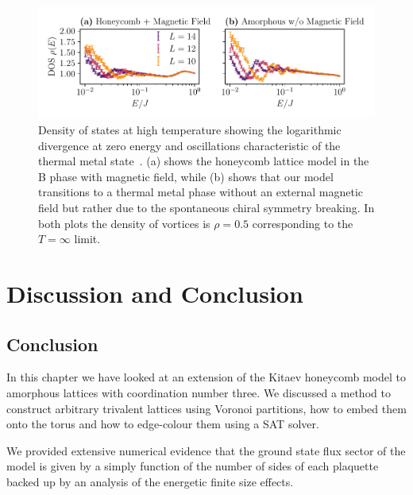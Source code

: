 \hypertarget{fig:DOS_oscillations}{%
\begin{figure}
\centering
\includegraphics[width=1\textwidth,height=\textheight]{figure_code/amk_chapter/results/DOS_oscillations/DOS_oscillations}
\caption[{Distinctive Oscillations in the Density of States}]{Density of states at high temperature showing the logarithmic divergence at zero energy and oscillations characteristic of the thermal metal state~\autocite{bocquet_disordered_2000,selfThermallyInducedMetallic2019}. (a) shows the honeycomb lattice model in the B phase with magnetic field, while (b) shows that our model transitions to a thermal metal phase without an external magnetic field but rather due to the spontaneous chiral symmetry breaking. In both plots the density of vortices is \(\rho = 0.5\) corresponding to the \(T = \infty\) limit.}
\label{fig:DOS_oscillations}
\end{figure}
}

\hypertarget{sec:AMK-Conclusion}{%
\section{Discussion and Conclusion}\label{sec:AMK-Conclusion}}

\hypertarget{conclusion}{%
\subsection{Conclusion}\label{conclusion}}

In this chapter we have looked at an extension of the Kitaev honeycomb model to amorphous lattices with coordination number three. We discussed a method to construct arbitrary trivalent lattices using Voronoi partitions, how to embed them onto the torus and how to edge-colour them using a SAT solver.

We provided extensive numerical evidence that the ground state flux sector of the model is given by a simply function of the number of sides of each plaquette backed up by an analysis of the energetic finite size effects.


